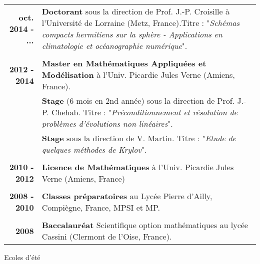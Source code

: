 \documentclass[10pt,a4paper]{report}
\begin{document}
\begin{center}
\begin{tabular}{r p{12cm}}
\textbf{oct. 2014 - ...} & \textbf{Doctorant} sous la direction de Prof. J.-P. Croisille à l'Université de Lorraine (Metz, France).\newline Titre : "\textit{Schémas compacts hermitiens sur la sphère - Applications en climatologie et océanographie numérique}".\\

& \\

\textbf{2012 - 2014} & \textbf{Master en Mathématiques Appliquées et Modélisation} à l'Univ. Picardie Jules Verne (Amiens, France). \\

& \textbf{Stage} (6 mois en 2nd année) sous la direction de Prof. J.-P. Chehab. \newline 
Titre : "\textit{Préconditionnement et résolution de problèmes d'évolutions non linéaires}". \\

& \textbf{Stage} sous la direction de V. Martin. \newline 
Titre : "\textit{Etude de quelques méthodes de Krylov}". \\

& \\

\textbf{2010 - 2012} & \textbf{Licence de Mathématiques} à l'Univ. Picardie Jules Verne (Amiens, France) \\

& \\

\textbf{2008 - 2010} & \textbf{Classes préparatoires} au Lycée Pierre d'Ailly, Compiègne, France,\newline
MPSI et MP. \\

& \\

\textbf{2008} & \textbf{Baccalauréat} Scientifique option mathématiques au lycée Cassini (Clermont de l'Oise, France).\\
\end{tabular}
\end{center}

\vspace{.5cm}
\noindent
{\selectfont
\begin{Large}
Ecoles d'été
\end{Large}
\hrulefill
}
\vspace{0.6cm}
\end{document}
